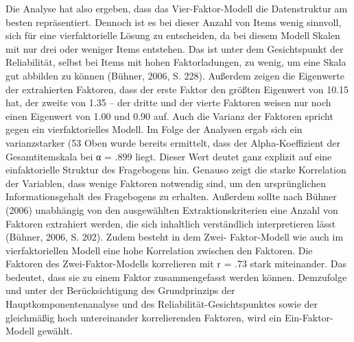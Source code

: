 \documentclass[12pt,a4paper]{article}
\begin{document}
Die Analyse hat also ergeben, dass das Vier-Faktor-Modell die Datenstruktur am besten repräsentiert. Dennoch ist es bei dieser Anzahl von Items wenig sinnvoll, sich für eine vierfaktorielle Lösung zu entscheiden, da bei diesem Modell Skalen mit nur drei oder weniger Items entstehen. Das ist unter dem Gesichtspunkt der Reliabilität, selbst bei Items mit hohen Faktorladungen, zu wenig, um eine Skala gut abbilden zu können (Bühner, 2006, S. 228). Außerdem zeigen die Eigenwerte der extrahierten Faktoren, dass der erste Faktor den größten Eigenwert von 10.15 hat, der zweite von 1.35 –  der dritte und der vierte Faktoren weisen nur noch einen Eigenwert von 1.00 und 0.90 auf. Auch die Varianz der Faktoren spricht gegen ein vierfaktorielles Modell. Im Folge der Analysen ergab sich ein varianzstarker (53%
	Oben wurde bereits ermittelt, dass der Alpha-Koeffizient der Gesamtitemskala bei α = .899 liegt. Dieser Wert deutet ganz explizit auf eine einfaktorielle Struktur des Fragebogens hin. Genauso zeigt die starke Korrelation der Variablen, dass wenige Faktoren notwendig sind, um den ursprünglichen Informationsgehalt des Fragebogens zu erhalten. Außerdem sollte nach Bühner (2006) unabhängig von den ausgewählten Extraktionskriterien eine Anzahl von Faktoren extrahiert werden, die sich inhaltlich verständlich interpretieren lässt (Bühner, 2006, S. 202). Zudem besteht in dem Zwei- Faktor-Modell wie auch im vierfaktoriellen Modell eine hohe Korrelation zwischen den Faktoren. Die Faktoren des Zwei-Faktor-Modells korrelieren mit r = .73 stark miteinander. Das bedeutet, dass sie zu einem Faktor zusammengefasst werden können. Demzufolge und unter der Berücksichtigung des Grundprinzips der Hauptkomponentenanalyse und des Reliabilität-Gesichtspunktes sowie der gleichmäßig hoch untereinander korrelierenden Faktoren, wird ein Ein-Faktor-Modell gewählt. 
\end{document}
